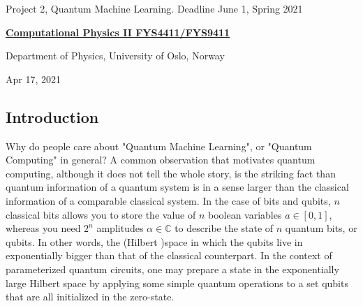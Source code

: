 \documentclass[%
oneside,                 %
final,                   %
10pt]{article}
\begin{document}

\newcommand{\exercisesection}[1]{\subsection*{#1}}






\thispagestyle{empty}

\begin{center}
{\LARGE\bf
\begin{spacing}{1.25}
Project 2, Quantum Machine Learning. Deadline June 1, Spring 2021
\end{spacing}
}
\end{center}


\begin{center}
{\bf \href{{http://www.uio.no/studier/emner/matnat/fys/FYS4411/index-eng.html}}{Computational Physics II FYS4411/FYS9411}}
\end{center}

    \begin{center}
\centerline{{\small Department of Physics, University of Oslo, Norway}}
\end{center}
    

\begin{center}
Apr 17, 2021
\end{center}

\vspace{1cm}


\subsection*{Introduction}

Why do people care about "Quantum Machine Learning", or "Quantum Computing" in general? A common observation that motivates quantum computing,
although it does not tell the whole story, is the striking fact than quantum information of a quantum system is in a sense
larger than the classical information of a comparable classical system. In the case of
bits and qubits, $n$ classical bits allows you to store the value of $n$ boolean variables $a \in [0,1]$,
whereas you need $2^n$ amplitudes $\alpha \in \mathbb{C}$ to describe the state of $n$ quantum bits, or qubits.
In other words, the (Hilbert )space in which the qubits live in exponentially bigger than that of the classical
counterpart. In the context of parameterized quantum circuits, one may prepare a state in the exponentially
large Hilbert space by applying some simple quantum operations to a set qubits that are all initialized in the zero-state.
\end{document}
